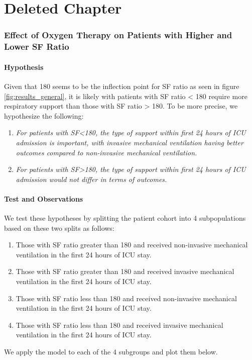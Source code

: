 
\chapter{Deleted Chapter} %

\label{AppendixA} %

\subsection{Effect of Oxygen Therapy on Patients with Higher and Lower SF Ratio}

\subsubsection{Hypothesis}
Given that 180 seems to be the inflection point for SF ratio as seen in figure \ref{fig:results_general}, it is likely with patients with SF ratio < 180 require more respiratory support than those with SF ratio > 180. To be more precise,  we hypothesize the following:

\begin{enumerate}
	\item \textit{For patients with SF<180, the type of support within first 24 hours of ICU admission is important, with invasive mechanical ventilation having better outcomes compared to non-invasive mechanical ventilation.}
	
	\item \textit{For patients with SF>180, the type of support within first 24 hours of ICU admission would not differ in terms of outcomes.}
\end{enumerate}

\subsubsection{Test and Observations}
We test these hypotheses by splitting the patient cohort into 4 subpopulations based on these two splits as follows:
\begin{enumerate}
	\item Those with SF ratio greater than 180 and received non-invasive mechanical ventilation in the first 24 hours of ICU stay. 
	\item Those with SF ratio greater than 180 and received invasive mechanical ventilation in the first 24 hours of ICU stay. 
	\item Those with SF ratio less than 180 and received non-invasive mechanical ventilation in the first 24 hours of ICU stay.  
	\item Those with SF ratio less than 180 and received invasive mechanical ventilation in the first 24 hours of ICU stay.  
\end{enumerate}

We apply the model to each of the 4 subgroups and plot them below. 

